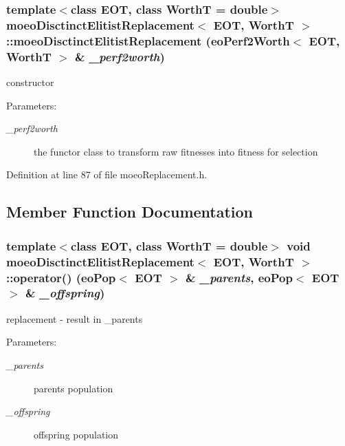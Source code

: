 \subsubsection{\setlength{\rightskip}{0pt plus 5cm}template$<$class EOT, class Worth\-T = double$>$ {\bf moeo\-Disctinct\-Elitist\-Replacement}$<$ EOT, Worth\-T $>$::{\bf moeo\-Disctinct\-Elitist\-Replacement} ({\bf eo\-Perf2Worth}$<$ EOT, Worth\-T $>$ \& {\em \_\-perf2worth})\hspace{0.3cm}{\tt  [inline]}}\label{classmoeoDisctinctElitistReplacement_f39200df2b68f6d35fbed2a2688a9d75}


constructor 

\begin{Desc}
\item[Parameters:]
\begin{description}
\item[{\em \_\-perf2worth}]the functor class to transform raw fitnesses into fitness for selection \end{description}
\end{Desc}


Definition at line 87 of file moeo\-Replacement.h.

\subsection{Member Function Documentation}
\subsubsection{\setlength{\rightskip}{0pt plus 5cm}template$<$class EOT, class Worth\-T = double$>$ void {\bf moeo\-Disctinct\-Elitist\-Replacement}$<$ EOT, Worth\-T $>$::operator() ({\bf eo\-Pop}$<$ EOT $>$ \& {\em \_\-parents}, {\bf eo\-Pop}$<$ EOT $>$ \& {\em \_\-offspring})\hspace{0.3cm}{\tt  [inline, virtual]}}\label{classmoeoDisctinctElitistReplacement_ca73704e827074092e7d228253427a8a}


replacement - result in \_\-parents 

\begin{Desc}
\item[Parameters:]
\begin{description}
\item[{\em \_\-parents}]parents population \item[{\em \_\-offspring}]offspring population \end{description}
\end{Desc}


